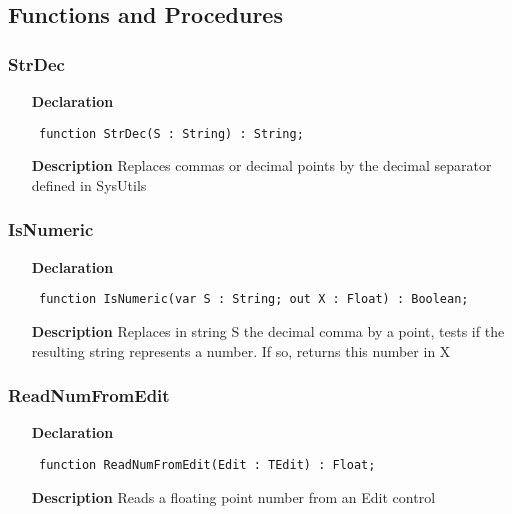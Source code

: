 \documentclass[12pt,a4paper,oneside]{report}
\newcommand{\declarationitem}[1]{\textbf{#1}}
\newcommand{\descriptiontitle}[1]{\textbf{#1}}
\newcommand{\code}[1]{\texttt{#1}}
\begin{document}
\subsection{Functions and Procedures}
\subsubsection{StrDec}
\label{uwinstr-StrDec}
\begin{itemize}\item[\declarationitem{Declaration}\hfill]
	\begin{flushleft}
		\code{
			function StrDec(S : String) : String;}
		
	\end{flushleft}
	
	\par
	\item[\descriptiontitle{Description}]
	Replaces commas or decimal points by the decimal separator defined in SysUtils
	
\end{itemize}
\subsubsection{IsNumeric}
\label{uwinstr-IsNumeric}
\begin{itemize}\item[\declarationitem{Declaration}\hfill]
	\begin{flushleft}
		\code{
			function IsNumeric(var S : String; out X : Float) : Boolean;}
		
	\end{flushleft}
	
	\par
	\item[\descriptiontitle{Description}]
	Replaces in string S the decimal comma by a point, tests if the resulting string represents a number. If so, returns this number in X
	
\end{itemize}
\subsubsection{ReadNumFromEdit}
\label{uwinstr-ReadNumFromEdit}
\begin{itemize}\item[\declarationitem{Declaration}\hfill]
	\begin{flushleft}
		\code{
			function ReadNumFromEdit(Edit : TEdit) : Float;}
		
	\end{flushleft}
	
	\par
	\item[\descriptiontitle{Description}]
	Reads a floating point number from an Edit control
	
\end{itemize}
\end{document}
